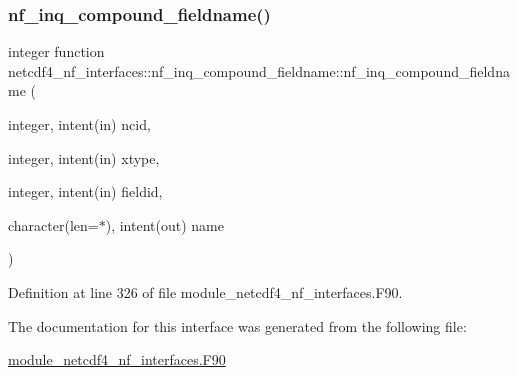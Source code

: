 \subsubsection{\texorpdfstring{nf\+\_\+inq\+\_\+compound\+\_\+fieldname()}{nf\_inq\_compound\_fieldname()}}
{\footnotesize\ttfamily integer function netcdf4\+\_\+nf\+\_\+interfaces\+::nf\+\_\+inq\+\_\+compound\+\_\+fieldname\+::nf\+\_\+inq\+\_\+compound\+\_\+fieldname (\begin{DoxyParamCaption}\item[{integer, intent(in)}]{ncid,  }\item[{integer, intent(in)}]{xtype,  }\item[{integer, intent(in)}]{fieldid,  }\item[{character(len=$\ast$), intent(out)}]{name }\end{DoxyParamCaption})}



Definition at line 326 of file module\+\_\+netcdf4\+\_\+nf\+\_\+interfaces.\+F90.



The documentation for this interface was generated from the following file\+:\begin{DoxyCompactItemize}
\item 
\hyperlink{module__netcdf4__nf__interfaces_8F90}{module\+\_\+netcdf4\+\_\+nf\+\_\+interfaces.\+F90}\end{DoxyCompactItemize}
